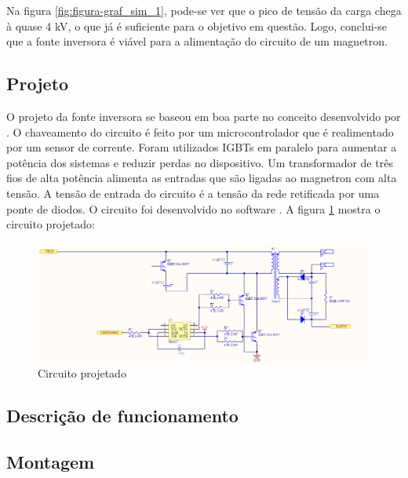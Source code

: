 Na figura \ref{fig:figura-graf_sim_1}, pode-se ver que o pico de tensão da carga chega à quase 4 kV, o que já é suficiente para o objetivo em questão. Logo, conclui-se que a fonte inversora é viável para a alimentação do circuito de um magnetron.

\subsection{Projeto}

O projeto da fonte inversora se baseou em boa parte no conceito desenvolvido por . O chaveamento do circuito é feito por um microcontrolador que é realimentado por um sensor de corrente. Foram utilizados IGBTs em paralelo para aumentar a potência dos sistemas e reduzir perdas no dispositivo. Um transformador de três fios de alta potência alimenta as entradas que são ligadas ao magnetron com alta tensão. A tensão de entrada do circuito é a tensão da rede retificada por uma ponte de diodos. O circuito foi desenvolvido no software . A figura \ref{fig:proj-font-inv} mostra o circuito projetado:

\begin{figure}[!htb]
    \centering
    \includegraphics[width=1.1\textwidth]{./dados/figuras/proj-font-inv}
    \caption{Circuito projetado}
    \label{fig:proj-font-inv}
\end{figure}

\subsection{Descrição de funcionamento}

\subsection{Montagem}

\section{}
\label{sec:shunt}


